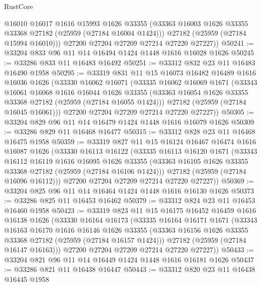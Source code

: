 \begin{lexlean}{RustCore}
\begin{coremodule}
          @16010
          @16017
          @1616
          @15993
          @1626
          @33355
          (@33363 @16003 @1626 @33355 @33368 @27182 (@25959 (@27184 @16004 @1424)))
          @27182
          (@25959 (@27184 @15994 @16010)))
        @27200
        @27204
        @27209
        @27214
        @27220
        @27227))
@50241 := @33204 @833 @96 @11 @14 @16494 @1424 @1448 @1616 @16028 @1626
@50245 := @33286 @833 @11 @16483 @16492
@50251 := @33312 @832 @23 @11 @16483 @16490 @1958
@50295 := @33319
    @831
    @11
    @15
    @16073
    @16482
    @16489
    @1616
    @16036
    @1626
    (@33330
      @16062
      @16071
      (@33335
        @16062
        @16069
        @1671
        (@33343
          @16061
          @16068
          @1616
          @16044
          @1626
          @33355
          (@33363 @16054 @1626 @33355 @33368 @27182 (@25959 (@27184 @16055 @1424)))
          @27182
          (@25959 (@27184 @16045 @16061)))
        @27200
        @27204
        @27209
        @27214
        @27220
        @27227))
@50305 := @33204 @829 @96 @11 @14 @16479 @1424 @1448 @1616 @16079 @1626
@50309 := @33286 @829 @11 @16468 @16477
@50315 := @33312 @828 @23 @11 @16468 @16475 @1958
@50359 := @33319
    @827
    @11
    @15
    @16124
    @16467
    @16474
    @1616
    @16087
    @1626
    (@33330
      @16113
      @16122
      (@33335
        @16113
        @16120
        @1671
        (@33343
          @16112
          @16119
          @1616
          @16095
          @1626
          @33355
          (@33363 @16105 @1626 @33355 @33368 @27182 (@25959 (@27184 @16106 @1424)))
          @27182
          (@25959 (@27184 @16096 @16112)))
        @27200
        @27204
        @27209
        @27214
        @27220
        @27227))
@50369 := @33204 @825 @96 @11 @14 @16464 @1424 @1448 @1616 @16130 @1626
@50373 := @33286 @825 @11 @16453 @16462
@50379 := @33312 @824 @23 @11 @16453 @16460 @1958
@50423 := @33319
    @823
    @11
    @15
    @16175
    @16452
    @16459
    @1616
    @16138
    @1626
    (@33330
      @16164
      @16173
      (@33335
        @16164
        @16171
        @1671
        (@33343
          @16163
          @16170
          @1616
          @16146
          @1626
          @33355
          (@33363 @16156 @1626 @33355 @33368 @27182 (@25959 (@27184 @16157 @1424)))
          @27182
          (@25959 (@27184 @16147 @16163)))
        @27200
        @27204
        @27209
        @27214
        @27220
        @27227))
@50433 := @33204 @821 @96 @11 @14 @16449 @1424 @1448 @1616 @16181 @1626
@50437 := @33286 @821 @11 @16438 @16447
@50443 := @33312 @820 @23 @11 @16438 @16445 @1958

\end{coremodule}
\end{lexlean}
